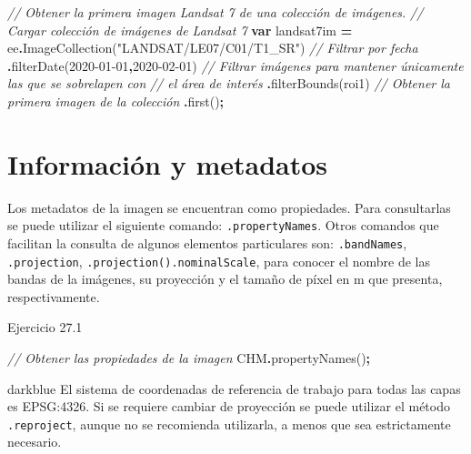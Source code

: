 \documentclass[
  12pt,
  letterpaper,
  twoside]{book}
\newenvironment{Shaded}{\begin{snugshade}}{\end{snugshade}}
\newcommand{\CommentTok}[1]{\textcolor[rgb]{0.56,0.35,0.01}{\textit{#1}}}
\newcommand{\FunctionTok}[1]{\textcolor[rgb]{0.00,0.00,0.00}{#1}}
\newcommand{\KeywordTok}[1]{\textcolor[rgb]{0.13,0.29,0.53}{\textbf{#1}}}
\newcommand{\NormalTok}[1]{#1}
\newcommand{\OperatorTok}[1]{\textcolor[rgb]{0.81,0.36,0.00}{\textbf{#1}}}
\newcommand{\StringTok}[1]{\textcolor[rgb]{0.31,0.60,0.02}{#1}}
\begin{document}
\begin{Shaded}
\begin{Highlighting}[]
\CommentTok{// Obtener la primera imagen Landsat 7 de una colección de imágenes.}
\CommentTok{// Cargar colección de imágenes de Landsat 7          }
\KeywordTok{var}\NormalTok{ landsat7im }\OperatorTok{=}\NormalTok{ ee}\OperatorTok{.}\FunctionTok{ImageCollection}\NormalTok{(}\StringTok{"LANDSAT/LE07/C01/T1\_SR"}\NormalTok{)}
  \CommentTok{// Filtrar por fecha}
  \OperatorTok{.}\FunctionTok{filterDate}\NormalTok{(}\StringTok{\textquotesingle{}2020{-}01{-}01\textquotesingle{}}\OperatorTok{,}\StringTok{\textquotesingle{}2020{-}02{-}01\textquotesingle{}}\NormalTok{)}
  \CommentTok{// Filtrar imágenes para mantener únicamente las que se sobrelapen con }
  \CommentTok{// el área de interés}
  \OperatorTok{.}\FunctionTok{filterBounds}\NormalTok{(roi1)}
  \CommentTok{// Obtener la primera imagen de la colección}
  \OperatorTok{.}\FunctionTok{first}\NormalTok{()}\OperatorTok{;}
\end{Highlighting}
\end{Shaded}

\hypertarget{informaciuxf3n-y-metadatos-3}{%
\section{Información y metadatos}\label{informaciuxf3n-y-metadatos-3}}

Los metadatos de la imagen se encuentran como propiedades. Para consultarlas se puede utilizar el siguiente comando: \texttt{.propertyNames}. Otros comandos que facilitan la consulta de algunos elementos particulares son: \texttt{.bandNames}, \texttt{.projection}, \texttt{.projection().nominalScale}, para conocer el nombre de las bandas de la imágenes, su proyección y el tamaño de píxel en m que presenta, respectivamente.

Ejercicio 27.1

\begin{Shaded}
\begin{Highlighting}[]
\CommentTok{// Obtener las propiedades de la imagen}
\NormalTok{CHM}\OperatorTok{.}\FunctionTok{propertyNames}\NormalTok{()}\OperatorTok{;}
\end{Highlighting}
\end{Shaded}

\begin{bluebox2}

\begin{awesomeblock}{5pt}{\faLightbulb}{darkblue}
El sistema de coordenadas de referencia de trabajo para todas las capas es EPSG:4326. Si se requiere cambiar de proyección se puede utilizar el método \texttt{.reproject}, aunque no se recomienda utilizarla, a menos que sea estrictamente necesario.

\end{awesomeblock}

\end{bluebox2}
\end{document}
